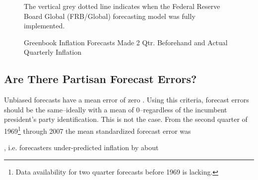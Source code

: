 \documentclass[a4paper]{article}
\makeatletter
\newenvironment{kframe}{%
 \def\at@end@of@kframe{}%
 \ifinner\ifhmode%
  \def\at@end@of@kframe{\end{minipage}}%
  \begin{minipage}{\columnwidth}%
 \fi\fi%
 \def\FrameCommand##1{\hskip\@totalleftmargin \hskip-\fboxsep
 \colorbox{shadecolor}{##1}\hskip-\fboxsep
     \hskip-\linewidth \hskip-\@totalleftmargin \hskip\columnwidth}%
 \MakeFramed {\advance\hsize-\width
   \@totalleftmargin\z@ \linewidth\hsize
   \@setminipage}}%
 {\par\unskip\endMakeFramed%
 \at@end@of@kframe}
\newenvironment{knitrout}{}{} %
\makeatother
\begin{document}
\begin{figure}[t]
    \caption{Greenbook Inflation Forecasts Made 2 Qtr. Beforehand and Actual Quarterly Inflation}
    \label{absolute}
    \begin{center}
    
\begin{knitrout}
\color{fgcolor}\begin{kframe}


{\ttfamily\noindent\bfseries\color{errorcolor}{\#\# Error: there is no package called 'reshape2'}}\end{kframe}
\end{knitrout}

    
    \end{center}
    \begin{singlespace}
        {\scriptsize{The vertical grey dotted line indicates when the Federal Reserve Board Global (FRB/Global) forecasting model was fully implemented.  
                      }}
    \end{singlespace}
\end{figure}


\subsection{Are There Partisan Forecast Errors?}

\begin{knitrout}
\color{fgcolor}\begin{kframe}


{\ttfamily\noindent\bfseries\color{errorcolor}{\#\# Error: there is no package called 'plotrix'}}\end{kframe}
\end{knitrout}


Unbiased forecasts have a mean error of zero \citep[5]{Bruck2006}. Using this criteria, forecast errors should be the same--ideally with a mean of 0--regardless of the incumbent president's party identification. This is not the case. From the second quarter of 1969\footnote{Data availability for two quarter forecasts before 1969 is lacking.} through 2007 the mean standardized forecast error was 

{\ttfamily\noindent\bfseries\color{errorcolor}{\\Error in mean(cpi.data\$error.prop.deflator.q2, na.rm = TRUE) : \\\ \ object 'cpi.data' not found}}, i.e. forecasters under-predicted inflation by about 
\end{document}

